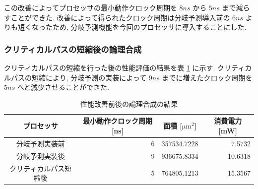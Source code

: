 \documentclass[../improvements.tex]{subfiles}
\begin{document}
  この改善によってプロセッサの最小動作クロック周期を $8\unit{ns}$ から $5\unit{ns}$ まで減らすことができた.
  改善によって得られたクロック周期は分岐予測導入前の $6\unit{ns}$ よりも短くなったため, 
  分岐予測機能を今回のプロセッサに導入することにした.

  \subsubsection{クリティカルパスの短縮後の論理合成}
  クリティカルパスの短縮を行った後の性能評価の結果を表 \ref{table:logic-synthesis-improved} に示す.
  クリティカルパスの短縮により, 分岐予測の実装によって $9\unit{ns}$ までに増えたクロック周期を
  $5\unit{ns}$ へと減少させることができた.

  \begin{table}[t]
    \centering
    \caption{性能改善前後の論理合成の結果}
    \label{table:logic-synthesis-improved}
    \begin{tabular}{|c|r|r|r|}
    \hline
    プロセッサ & \multicolumn{1}{c|}{最小動作クロック周期 {[}\unit{ns}{]}} & \multicolumn{1}{c|}{面積 {[}$\unit{\um}^2${]}} & \multicolumn{1}{c|}{消費電力 {[}\unit{\mW}{]}} \\ \hline
    分岐予測実装前 & 6 & 357534.7228 & 7.5732 \\
    分岐予測実装後 & 9 & 936675.8334 & 10.6318 \\
    クリティカルパス短縮後 & 5 & 764805.1213 & 15.3567 \\ \hline
    \end{tabular}
  \end{table}
\end{document}
